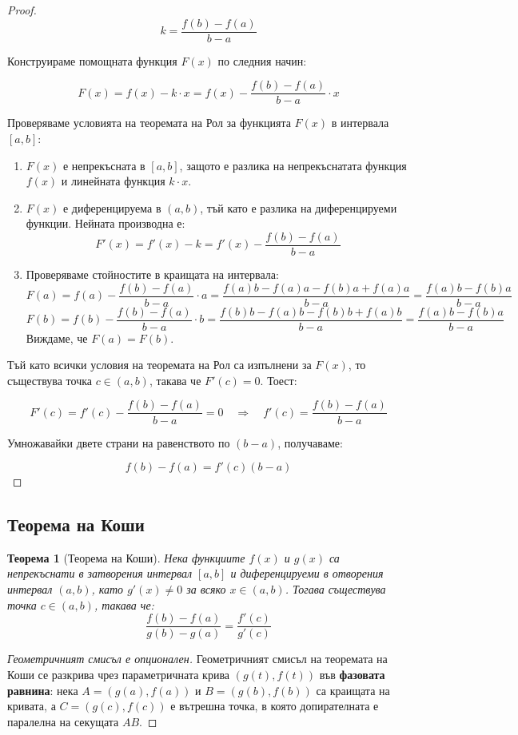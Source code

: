 \documentclass{scrartcl}
\newtheorem{theorem}{Теорема}
\begin{document}
\begin{FlushLeft}
\begin{proof}
\[ k = \frac{f(b) - f(a)}{b - a} \]

Конструираме помощната функция $F(x)$ по следния начин:

\[ F(x) = f(x) - k \cdot x = f(x) - \frac{f(b) - f(a)}{b - a} \cdot x \]

Проверяваме условията на теоремата на Рол за функцията $F(x)$ в интервала $[a, b]$:
\begin{enumerate}
    \item $F(x)$ е непрекъсната в $[a, b]$, защото е разлика на непрекъснатата функция $f(x)$ и линейната функция $k \cdot x$.
    \item $F(x)$ е диференцируема в $(a, b)$, тъй като е разлика на диференцируеми функции. Нейната производна е:
    \[ F'(x) = f'(x) - k = f'(x) - \frac{f(b) - f(a)}{b - a} \]
    \item Проверяваме стойностите в краищата на интервала:
    \[ F(a) = f(a) - \frac{f(b) - f(a)}{b - a} \cdot a = \frac{f(a)b - f(a)a - f(b)a + f(a)a}{b - a} = \frac{f(a)b - f(b)a}{b - a} \]
    \[ F(b) = f(b) - \frac{f(b) - f(a)}{b - a} \cdot b = \frac{f(b)b - f(a)b - f(b)b + f(a)b}{b - a} = \frac{f(a)b - f(b)a}{b - a} \]
    Виждаме, че $F(a) = F(b)$.
\end{enumerate}

Тъй като всички условия на теоремата на Рол са изпълнени за $F(x)$, то съществува точка $c \in (a, b)$, такава че $F'(c) = 0$. Тоест:

\[ F'(c) = f'(c) - \frac{f(b) - f(a)}{b - a} = 0 \quad \Rightarrow \quad f'(c) = \frac{f(b) - f(a)}{b - a} \]

Умножавайки двете страни на равенството по $(b - a)$, получаваме:

\[ f(b) - f(a) = f'(c)(b - a) \]
\end{proof}

\subsection{Теорема на Коши}

\begin{theorem}[Теорема на Коши]
Нека функциите $f(x)$ и $g(x)$ са непрекъснати в затворения интервал $[a, b]$ и диференцируеми в отворения интервал $(a, b)$, като $g'(x) \neq 0$ за всяко $x \in (a, b)$. Тогава съществува точка $c \in (a, b)$, такава че:
\[ \frac{f(b) - f(a)}{g(b) - g(a)} = \frac{f'(c)}{g'(c)} \]
\end{theorem}

\begin{proof}
[Геометричният смисъл е опционален] Геометричният смисъл на теоремата на Коши се разкрива чрез параметричната крива $(g(t), f(t))$ във \textbf{фазовата равнина}: нека $A = (g(a), f(a))$ и $B = (g(b), f(b))$ са краищата на кривата, а $C = (g(c), f(c))$ е вътрешна точка, в която допирателната е паралелна на секущата $AB$.


\end{proof}
\end{FlushLeft}
\end{document}
